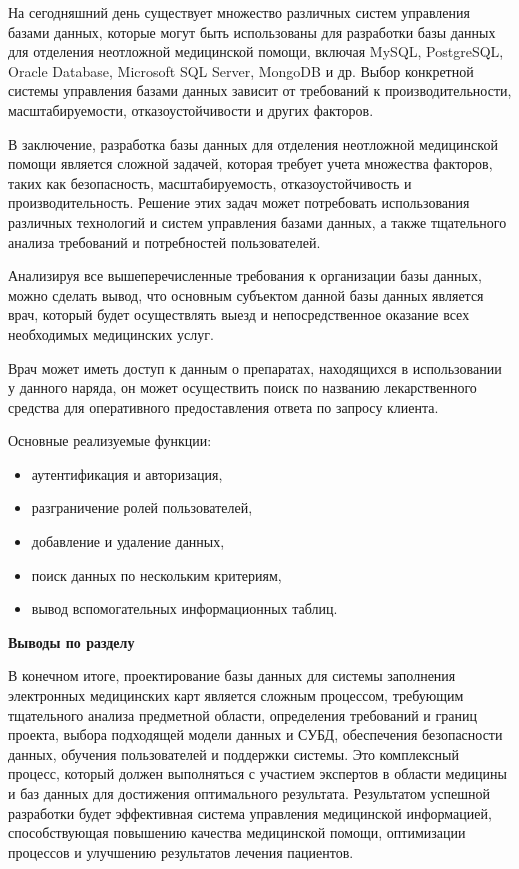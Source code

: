 На сегодняшний день существует множество различных систем управления базами данных, которые могут быть использованы для разработки базы данных для отделения неотложной медицинской помощи, включая MySQL, PostgreSQL, Oracle Database, Microsoft SQL Server, MongoDB и др. Выбор конкретной системы управления базами данных зависит от требований к производительности, масштабируемости, отказоустойчивости и других факторов.

В заключение, разработка базы данных для отделения неотложной медицинской помощи является сложной задачей, которая требует учета множества факторов, таких как безопасность, масштабируемость, отказоустойчивость и производительность. Решение этих задач может потребовать использования различных технологий и систем управления базами данных, а также тщательного анализа требований и потребностей пользователей.

Анализируя все вышеперечисленные требования к организации базы данных, можно сделать вывод, что основным субъектом данной базы данных является врач, который будет осуществлять выезд и непосредственное оказание всех необходимых медицинских услуг.

Врач может иметь доступ к данным о препаратах, находящихся в использовании у данного наряда, он может осуществить поиск по названию лекарственного средства для оперативного предоставления ответа по запросу клиента.

Основные реализуемые функции:
\begin{itemize}
    \item аутентификация и авторизация,
    \item разграничение ролей пользователей,
    \item добавление и удаление данных,
    \item поиск данных по нескольким критериям,
    \item вывод вспомогательных информационных таблиц.
\end{itemize}



\textbf{Выводы по разделу}

В конечном итоге, проектирование базы данных для системы заполнения электронных медицинских карт является сложным процессом, требующим тщательного анализа предметной области, определения требований и границ проекта, выбора подходящей модели данных и СУБД, обеспечения безопасности данных, обучения пользователей и поддержки системы. Это комплексный процесс, который должен выполняться с участием экспертов в области медицины и баз данных для достижения оптимального результата. Результатом успешной разработки будет эффективная система управления медицинской информацией, способствующая повышению качества медицинской помощи, оптимизации процессов и улучшению результатов лечения пациентов.